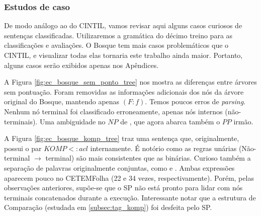 \subsubsection{Estudos de caso}
\label{subsec:ec-bosque}

De modo análogo ao do CINTIL, vamos revisar aqui alguns casos curiosos de sentenças classificadas. Utilizaremos a gramática do décimo treino para as classificações e avaliações. O Bosque tem mais casos problemáticos que o CINTIL, e visualizar todas elas tornaria este trabalho ainda maior. Portanto, alguns casos serão exibidos apenas nos Apêndices.
\begin{center}
    
\end{center}

A Figura \ref{fig:ec_bosque_sem_ponto_tree} nos mostra as diferenças entre árvores sem pontuação. Foram removidas as informações adicionais dos nós da árvore original do Bosque, mantendo apenas $(F:f)$.
Temos poucos erros de \textit{parsing}. Nenhum nó terminal foi classificado erroneamente, apenas nós internos (não-terminais). Uma ambiguidade no $NP$ de , que agora abarca também o $PP$ irmão. 

\begin{center}
    
\end{center}

A Figura \ref{fig:ec_bosque_komp_tree} traz uma sentença que, originalmente, possui o par $KOMP<:acl$ internamente. É notório como as regras unárias (Não-terminal $\rightarrow$ terminal) são mais consistentes que as binárias. Curioso também a separação de palavras originalmente conjuntas, como  e . Ambas expressões aparecem pouco no CETEMFolha (22 e 34 vezes, respectivamente). Porém, pelas observações anteriores, supõe-se que o SP não está pronto para lidar com nós terminais concatenados durante a execução. 
Interessante notar que a estrutura de Comparação (estudada em \ref{subsec:tag_komp}) foi desfeita pelo SP.

\begin{center}
    
\end{center}

